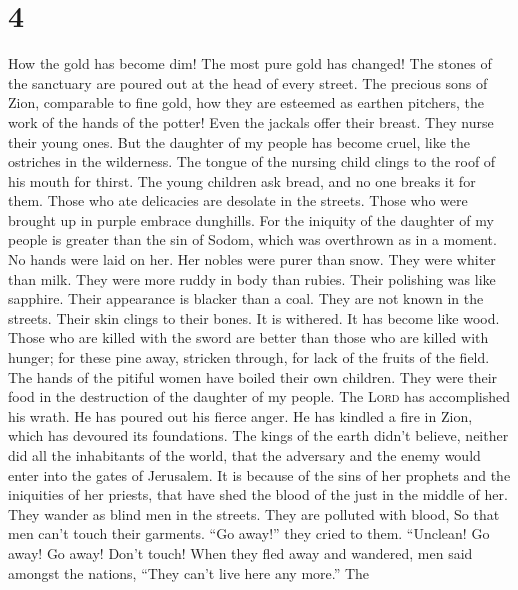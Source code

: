 \hypertarget{section-3}{%
\section{4}\label{section-3}}

 How the gold has become dim! The most pure gold has
changed! The stones of the sanctuary are poured out at the head of every
street.  The precious sons of Zion, comparable to fine
gold, how they are esteemed as earthen pitchers, the work of the hands
of the potter!  Even the jackals offer their breast. They
nurse their young ones. But the daughter of my people has become cruel,
like the ostriches in the wilderness.  The tongue of the
nursing child clings to the roof of his mouth for thirst. The young
children ask bread, and no one breaks it for them.  Those
who ate delicacies are desolate in the streets. Those who were brought
up in purple embrace dunghills.  For the iniquity of the
daughter of my people is greater than the sin of Sodom, which was
overthrown as in a moment. No hands were laid on her.  Her
nobles were purer than snow. They were whiter than milk. They were more
ruddy in body than rubies. Their polishing was like sapphire.
 Their appearance is blacker than a coal. They are not
known in the streets. Their skin clings to their bones. It is withered.
It has become like wood.  Those who are killed with the
sword are better than those who are killed with hunger; for these pine
away, stricken through, for lack of the fruits of the field.
 The hands of the pitiful women have boiled their own
children. They were their food in the destruction of the daughter of my
people.  The \textsc{Lord} has accomplished his wrath. He
has poured out his fierce anger. He has kindled a fire in Zion, which
has devoured its foundations.  The kings of the earth
didn't believe, neither did all the inhabitants of the world, that the
adversary and the enemy would enter into the gates of Jerusalem.
 It is because of the sins of her prophets and the
iniquities of her priests, that have shed the blood of the just in the
middle of her.  They wander as blind men in the streets.
They are polluted with blood, So that men can't touch their garments.
 ``Go away!'' they cried to them. ``Unclean! Go away! Go
away! Don't touch! When they fled away and wandered, men said amongst
the nations, ``They can't live here any more.''  The
